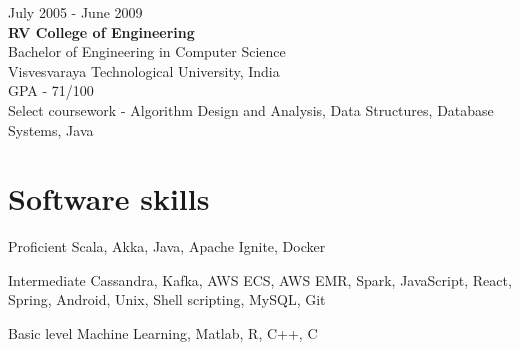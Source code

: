 \documentclass{tccv}
\begin{document}
{\hfill\sc July 2005 - June 2009}\\
\textbf{RV College of Engineering}\\
Bachelor of Engineering in Computer Science\\
Visvesvaraya Technological University, India\\
GPA - 71/100\\
Select coursework - Algorithm Design and Analysis, Data Structures, Database Systems, Java\\ 


\vspace{-0.2in}
\section{Software skills}
\begin{factlist}
\item{Proficient}
     {Scala, Akka, Java, Apache Ignite, Docker}

\item{Intermediate}
     {Cassandra, Kafka, AWS ECS, AWS EMR, Spark, JavaScript, React, Spring, Android, Unix, Shell scripting, MySQL, Git}

\item{Basic level}
     {Machine Learning, Matlab, R, C++, C}
\end{factlist}
\end{document}
